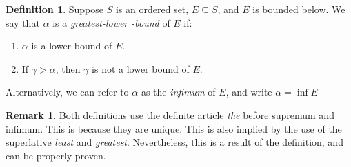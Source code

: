 \documentclass{article}
\theoremstyle{definition}
\newtheorem{definition}{Definition}[section]
\newtheorem{remark}{Remark}[section]
\begin{document}
	\begin{definition}\label{def1.9}
		Suppose $ S $ is an ordered set, $ E\subseteq S $, and $ E $ is bounded below. We say that $ \alpha $ is a \textit{\color{red}greatest-lower -bound} of $ E $ if:
		\begin{enumerate}
			\item $ \alpha $ is a lower bound of $ E $.
			\item If $ \gamma>\alpha $, then $ \gamma $ is not a lower bound of $ E $.
		\end{enumerate}
		Alternatively, we can refer to $ \alpha $ as the \textit{\color{red}infimum} of $ E $, and write $ \alpha=\inf E $
	\end{definition}
	\begin{remark}
		Both definitions use the definite article \textit{the} before supremum and infimum. This is because they are unique. This is also implied by the use of the superlative \textit{least} and \textit{greatest}. Nevertheless, this is a result of the definition, and can be properly proven. 
	\end{remark}
	
\end{document}
